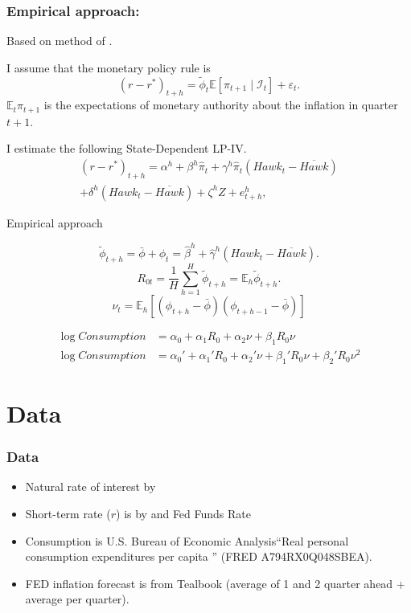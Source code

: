 \documentclass[11pt,pdf,aspectratio=129]{beamer}
\begin{document}
\begin{frame}\frametitle{Empirical approach:}
Based on method of \citet{HIM2023}.

I assume that the monetary policy rule is 
\[\left(r-r^*\right)_{t+h}=\tilde\phi_t\mathbb{E}\left[\pi_{t+1}\mid \mathcal{I}_t\right]+\varepsilon_t.\]
$\mathbb{E}_t\pi_{t+1}$ is the expectations of monetary authority about the inflation in quarter $t+1$.

I estimate the following State-Dependent LP-IV.
\begin{multline*}
    \left(r-r^*\right)_{t+h}=\alpha^h+\beta^h \hat\pi_t+\gamma^h \hat\pi_t\left(\mathit{Hawk}_{t}-\overline{\mathit{Hawk}}\right)\\ +\delta^h\left(\mathit{Hawk}_{t}-\overline{\mathit{Hawk}}\right)+\zeta^hZ+e_{t+h}^h,
\end{multline*}
\end{frame}

\begin{frame}{Empirical approach }

    \[\tilde \phi_{t+h}=\bar\phi+\phi_t=\hat \beta^h+\hat\gamma^h \left(\mathit{Hawk}_{t}-\overline{\mathit{Hawk}}\right).\]
    \[R_{0t}=\frac{1}{H}\sum_{h=1}^{H} \tilde \phi_{t+h}=\mathbb{E}_h \tilde \phi_{t+h}.\]
    \[\nu_t=\mathbb{E}_{h}\left[\left(\phi_{t+h}-\bar \phi\right)\left(\phi_{t+h-1}-\bar \phi\right)\right]\]

    \begin{align}
        \log \mathit{Consumption}&=\alpha_0+\alpha_1 R_0+\alpha_2\nu+\beta_1 R_0\nu \label{eq:linear}\\
        \log \mathit{Consumption}&=\alpha_0'+\alpha_1' R_0+\alpha_2'\nu+\beta_1' R_0\nu + \beta_2' R_0\nu^2\label{eq:quadratic}
    \end{align} 
\end{frame}






\section{Data}
\begin{frame}\frametitle{Data}
\begin{itemize}\setlength\itemsep{1em}
        \item Natural rate of interest by \citet{HLW2017,HLW2023}
        \item Short-term rate ($r$) is by \citet{WuXia2016} and Fed Funds Rate 
        \item Consumption is U.S. Bureau of Economic Analysis``Real personal consumption expenditures per capita ''  (FRED A794RX0Q048SBEA).
        \item FED inflation forecast is from Tealbook (average of 1 and 2 quarter ahead + average per quarter).
    \end{itemize}
\end{frame}
\end{document}
